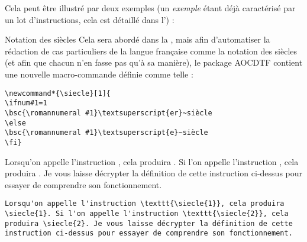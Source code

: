 \documentclass[a4paper, 11pt, twoside, fleqn]{memoir}
\begin{document}
	Cela peut être illustré par deux exemples (un \emph{exemple} étant déjà caractérisé par un lot d'instructions, cela est détaillé dans l') :
	
\begin{exemple}{Notation des siècles}{}
Cela sera abordé dans la , mais afin d'automatiser la rédaction de cas particuliers de la langue française comme la notation des siècles (et afin que chacun n'en fasse pas qu'à sa manière), le package AOCDTF contient une nouvelle macro-commande définie comme telle :
\begin{verbatim}
\newcommand*{\siecle}[1]{
\ifnum#1=1
\bsc{\romannumeral #1}\textsuperscript{er}~siècle
\else
\bsc{\romannumeral #1}\textsuperscript{e}~siècle
\fi}
\end{verbatim}

\begin{minipage}[t]{0.49\linewidth}
Lorsqu'on appelle l'instruction \texttt{}, cela produira . Si l'on appelle l'instruction \texttt{}, cela produira . Je vous laisse décrypter la définition de cette instruction ci-dessus pour essayer de comprendre son fonctionnement.
\end{minipage}
\hfill
\begin{minipage}[t]{0.49\linewidth}
\begin{verbatim}
Lorsqu'on appelle l'instruction \texttt{\siecle{1}}, cela produira \siecle{1}. Si l'on appelle l'instruction \texttt{\siecle{2}}, cela produira \siecle{2}. Je vous laisse décrypter la définition de cette instruction ci-dessus pour essayer de comprendre son fonctionnement.
\end{verbatim}
\end{minipage}
\end{exemple}
	
\end{document}
